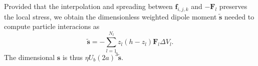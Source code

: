 Provided that the interpolation and spreading between ${\bm f}_{i,j,k}$ and $-{\bm F}_l$ preserves the local stress, we obtain the dimensionless weighted dipole moment $\tilde{\bm s}$ needed to compute particle interacions as
\begin{equation}
    \tilde{{\bm s}} = -\sum_{l=1}^{N_l} z_l(h-z_l) {\bm F_{l}} \Delta V_l.
    \label{formula}
\end{equation}
The dimensional ${\bm s}$ is thus $\eta U_b (2a)^3\tilde{\bm s}$.\\

%
%
%
%
